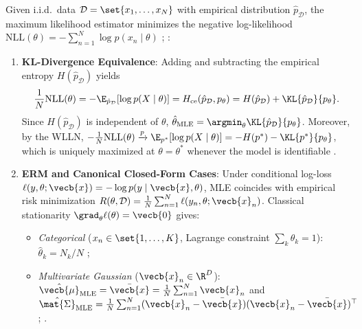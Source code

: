 \documentclass[../../../../master.tex]{subfiles}
\begin{document}
\begin{coremath}
Given i.i.d.\ data $\mathcal{D} = \set{x_1, \dots, x_N}$ with empirical distribution $\hat{p}_{\mathcal{D}}$, the maximum likelihood estimator minimizes the negative log-likelihood $\mathrm{NLL}(\theta) = -\sum_{n=1}^N \log p(x_n \mid \theta)$ ; :
\begin{enumerate}
  \item \textbf{KL-Divergence Equivalence}: Adding and subtracting the empirical entropy $H(\hat{p}_{\mathcal{D}})$ yields
  \begin{equation}
  \label{eq:asymp:mle-kl}
  \frac{1}{N}\mathrm{NLL}(\theta) = -\E_{\hat{p}_{\mathcal{D}}}[\log p(X \mid \theta)] = H_{\mathrm{ce}}(\hat{p}_{\mathcal{D}}, p_\theta) = H(\hat{p}_{\mathcal{D}}) + \KL{\hat{p}_{\mathcal{D}}}{p_\theta}.
  \end{equation}
  Since $H(\hat{p}_{\mathcal{D}})$ is independent of $\theta$, $\hat{\theta}_{\mathrm{MLE}} = \argmin_\theta \KL{\hat{p}_{\mathcal{D}}}{p_\theta}$. Moreover, by the WLLN, $-\frac{1}{N}\mathrm{NLL}(\theta) \xrightarrow{p} \E_{p^*}[\log p(X \mid \theta)] = -H(p^*) - \KL{p^*}{p_\theta}$, which is uniquely maximized at $\theta = \theta^*$ whenever the model is identifiable .
  \item \textbf{ERM and Canonical Closed-Form Cases}: Under conditional log-loss $\ell(y, \theta; \vecb{x}) = -\log p(y \mid \vecb{x}, \theta)$, MLE coincides with empirical risk minimization $R(\theta, \mathcal{D}) = \frac{1}{N}\sum_{n=1}^N \ell(y_n, \theta; \vecb{x}_n)$. Classical stationarity $\grad_\theta \ell(\theta) = \vecb{0}$ gives:
  \begin{itemize}
    \item \emph{Categorical} ($x_n \in \set{1,\dots,K}$, Lagrange constraint $\sum_k \theta_k = 1$): $\hat{\theta}_k = N_k / N$ ;
    \item \emph{Multivariate Gaussian} ($\vecb{x}_n \in \R^D$): $\hat{\vecb{\mu}}_{\mathrm{MLE}} = \bar{\vecb{x}} = \frac{1}{N}\sum_{n=1}^N \vecb{x}_n$ and $\hat{\mat{\Sigma}}_{\mathrm{MLE}} = \frac{1}{N}\sum_{n=1}^N (\vecb{x}_n - \bar{\vecb{x}})(\vecb{x}_n - \bar{\vecb{x}})^\top$ ; .

\end{itemize}
\end{enumerate}
\end{coremath}
\end{document}

